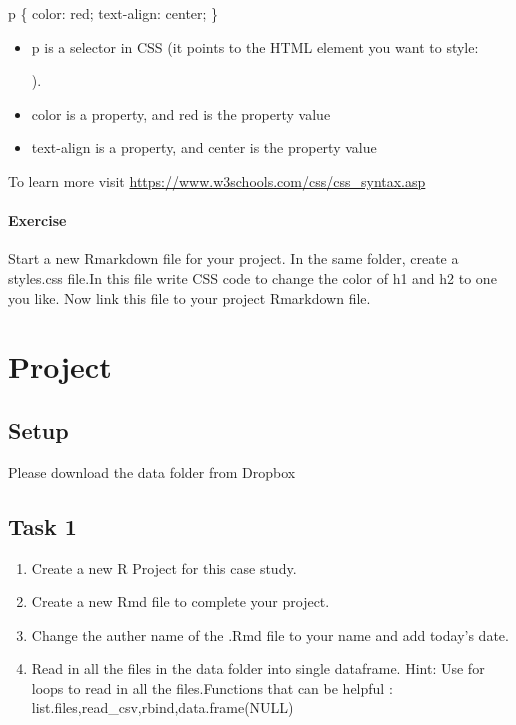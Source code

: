 \documentclass[
]{book}
\providecommand{\tightlist}{%
  \setlength{\itemsep}{0pt}\setlength{\parskip}{0pt}}
\begin{document}
p \{
color: red;
text-align: center;
\}

\begin{itemize}
\tightlist
\item
  p is a selector in CSS (it points to the HTML element you want to style:

  ).
\item
  color is a property, and red is the property value
\item
  text-align is a property, and center is the property value
\end{itemize}

To learn more visit \url{https://www.w3schools.com/css/css_syntax.asp}

\hypertarget{exercise-6}{%
\subsubsection*{Exercise}\label{exercise-6}}

Start a new Rmarkdown file for your project. In the same folder, create a styles.css file.In this file write CSS code to change the color of h1 and h2 to one you like. Now link this file to your project Rmarkdown file.

\hypertarget{project}{%
\chapter{Project}\label{project}}

\hypertarget{setup-1}{%
\section{Setup}\label{setup-1}}

Please download the data folder from Dropbox

\hypertarget{task-1}{%
\section{Task 1}\label{task-1}}

\begin{enumerate}
\def\labelenumi{\arabic{enumi}.}
\tightlist
\item
  Create a new R Project for this case study.
\item
  Create a new Rmd file to complete your project.
\item
  Change the auther name of the .Rmd file to your name and add today's date.
\item
  Read in all the files in the data folder into single dataframe. Hint: Use for loops to read in all the files.Functions that can be helpful : list.files,read\_csv,rbind,data.frame(NULL)
\end{enumerate}
\end{document}
